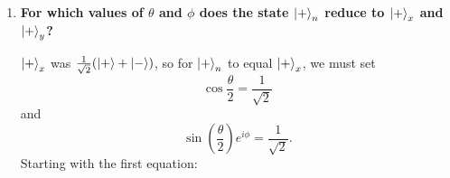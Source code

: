 \documentclass[11pt]{article}
\makeatletter
\newenvironment{amatrix}[1]{%
    \left[\begin{array}{@{}*{#1}{c}|c@{}}
}{%
    \end{array}\right]
}
\makeatother
\begin{document}
\begin{enumerate}[label=\textbf{\arabic*.}]
{\begin{enumerate}[label=\textbf{(\alph*)}]
{\begin{align*}
                        \sim
                        &\begin{amatrix}{2}\cos\theta-1 & \sin(\theta)e^{-i\phi} & 0 \\ 0 & -\frac{(\cos\theta+1)(\cos\theta-1)}{\cos\theta-1}-\frac{\sin^2(\theta)}{\cos\theta-1} & 0\end{amatrix} \\
                        \sim
                        &\begin{amatrix}{2}\cos\theta-1 & \sin(\theta)e^{-i\phi} & 0 \\ 0 & -\frac{\cos^2(\theta)-1+\sin^2(\theta)}{\cos\theta-1} & 0\end{amatrix} \\
                        \sim
                        &\begin{amatrix}{2}\cos\theta-1 & \sin(\theta)e^{-i\phi} & 0 \\ 0 & 0 & 0\end{amatrix}
                    \end{align*}
                    If \(\ket{+}_n=a\ket{+}+b\ket{-}\), then the above matrix corresponds to the equation
                    \begin{align*}
                        (\cos\theta-1)a+\sin(\theta)e^{-i\phi}b&=0 \\
                        (1-\cos\theta)a&=\sin(\theta)e^{-i\phi}b \\
                        \sin^2\left(\tfrac \theta 2 \right)a&=\frac 1 2 \sin(\theta)e^{-i\phi}b \\
                        \sin^2\left(\tfrac \theta 2 \right)e^{i\phi}a&=\sin(\theta)\cos^2\left(\tfrac \theta 2 \right)b
                    \end{align*}
                    So \(\ket{+}_n=\sin^2\left(\tfrac \theta 2 \right)e^{i\phi}\ket{+}+\sin(\theta)\cos^2\left(\tfrac \theta 2 \right)\ket{-}\).
                    \par
                    \textit{(I couldn't get the equation to match the form above.)}
                }
                \item{
                    \textbf{\boldmath For which values of \(\theta\) and \(\phi\) does the state \(\ket{+}_n\) reduce to \(\ket{+}_x\) and \(\ket{+}_y\)?}
                    \par
                    \(\ket{+}_x\) was \(\frac{1}{\sqrt 2}(\ket{+}+\ket{-})\), so for \(\ket{+}_n\) to equal \(\ket{+}_x\), we must set \[\cos\frac \theta 2=\frac{1}{\sqrt 2}\] and \[\sin\left(\frac \theta 2\right)e^{i\phi}=\frac{1}{\sqrt 2}.\] Starting with the first equation:
}
\end{enumerate}}
\end{enumerate}
\end{document}
